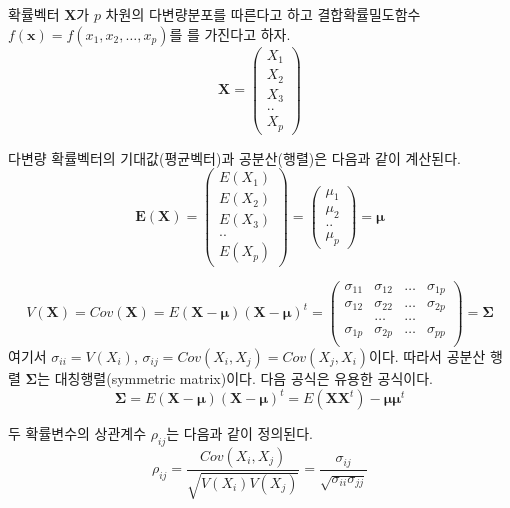 \documentclass[
]{book}
\theoremstyle{definition}
\theoremstyle{definition}
\theoremstyle{definition}
\theoremstyle{definition}
\theoremstyle{remark}
\begin{document}
확률벡터 \(\bm X\)가 \(p\) 차원의 다변량분포를 따른다고 하고 결합확률밀도함수 \(f(\bm x) =f(x_1,x_2,\dots,x_p)\)를
를 가진다고 하자.
\begin{equation*}
\bm X =
  \begin{pmatrix}
X_1 \\
X_2 \\
X_3 \\
..  \\
X_p
\end{pmatrix}
\end{equation*}

다변량 확률벡터의 기대값(평균벡터)과 공분산(행렬)은 다음과 같이 계산된다.
\begin{equation*}
\bm E(\bm X) =
  \begin{pmatrix}
E(X_1) \\
E(X_2) \\
E(X_3) \\
..  \\
E(X_p)
\end{pmatrix}
= 
  \begin{pmatrix}
\mu_1 \\
\mu_2 \\
..  \\
\mu_p
\end{pmatrix}
=\bm \mu
\end{equation*}

\begin{equation*}
V(\bm X) =Cov(\bm X) = E (\bm X-\bm \mu) (\bm X-\bm \mu)^t 
= 
  \begin{pmatrix}
\sigma_{11} & \sigma_{12} & \dots & \sigma_{1p} \\
\sigma_{12} & \sigma_{22} & \dots & \sigma_{2p} \\
& \dots & \dots & \\
\sigma_{1p} & \sigma_{2p} & \dots & \sigma_{pp} \\
\end{pmatrix}
= \bm \Sigma
\end{equation*}
여기서 \(\sigma_{ii}=V(X_i)\), \(\sigma_{ij} = Cov(X_i, X_j)=Cov(X_j, X_i)\)이다. 따라서 공분산 행렬
\(\bm \Sigma\)는 대칭행렬(symmetric matrix)이다. 다음 공식은 유용한 공식이다.
\[ \bm \Sigma = E (\bm X-\bm \mu) (\bm X-\bm \mu)^t  = E(\bm X \bm X^t)-\bm \mu \bm \mu^t \]

두 확률변수의 상관계수 \(\rho_{ij}\)는 다음과 같이 정의된다.
\[ \rho_{ij} = \frac{Cov(X_i, X_j)}{ \sqrt{V(X_i) V(X_j)}} = \frac{\sigma_{ij}}{\sqrt{\sigma_{ii}
  \sigma_{jj}}} \]
\end{document}
